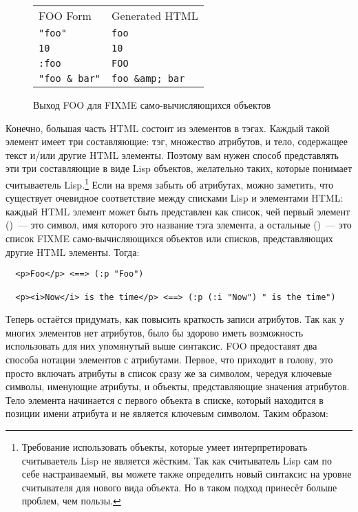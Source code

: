 \begin{figure}[tb]
\begin{tabular}{|>{\centering}m{25mm}|>{\centering}m{25mm}|}
  FOO Form &	Generated HTML \\
  \lstinline!"foo"! &\lstinline!foo! \\
  \lstinline!10! & \lstinline!10! \\
  \lstinline!:foo! & \lstinline!FOO! \\
  \lstinline!"foo & bar"! & \lstinline!foo &amp; bar!
\end{tabular}
  \caption{Выход FOO для FIXME само-вычисляющихся объектов} 
  \label{table:30-1}
\end{figure}

Конечно, большая часть HTML состоит из элементов в тэгах. Каждый такой элемент имеет три
составляющие: тэг, множество атрибутов, и тело, содержащее текст и/или другие HTML
элементы. Поэтому вам нужен способ представлять эти три составляющие в виде Lisp объектов,
желательно таких, которые понимает считываетель Lisp.\footnote{Требование использовать
  объекты, которые умеет интерпретировать считываетель Lisp не является жёстким. Так как
  считыватель Lisp сам по себе настраиваемый, вы можете также определить новый синтаксис
  на уровне считывателя для нового вида объекта. Но в таком подход принесёт больше
  проблем, чем пользы.} Если на время забыть об атрибутах, можно заметить, что существует
очевидное соответствие между списками Lisp и элементами HTML: каждый HTML элемент может
быть представлен как список, чей первый элемент ()~--- это символ, имя которого
это название тэга элемента, а остальные ()~--- это список FIXME
само-вычисляющихся объектов или списков, представляющих другие HTML элементы. Тогда:

\begin{verbatim}
  <p>Foo</p> <==> (:p "Foo")

  <p><i>Now</i> is the time</p> <==> (:p (:i "Now") " is the time")
\end{verbatim}

Теперь остаётся придумать, как повысить краткость записи атрибутов. Так как у многих
элементов нет атрибутов, было бы здорово иметь возможность использовать для них упомянутый
выше синтаксис. FOO предоставят два способа нотации элементов с атрибутами. Первое, что
приходит в голову, это просто включать атрибуты в список сразу же за символом, чередуя
ключевые символы, именующие атрибуты, и объекты, представляющие значения атрибутов. Тело
элемента начинается с первого объекта в списке, который находится в позиции имени атрибута
и не является ключевым символом. Таким образом:

